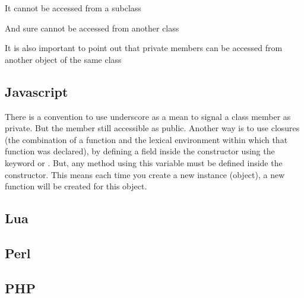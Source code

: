 \documentclass{KodeBook}
\begin{document}


It cannot be accessed from a subclass



And sure cannot be accessed from another class



It is also important to point out that private members can be accessed from another object of the same class 



\subsection{Javascript} 

There is a convention to use underscore \keyword{\_} as a mean to signal a class member as private. 
But the member still accessible as public. 
Another way is to use closures (the combination of a function and the lexical environment within which that function was declared), by defining a field inside the constructor using the keyword  or .
But, any method using this variable must be defined inside the constructor.
This means each time you create a new instance (object), a new function will be created for this object. 




\subsection{Lua}


\subsection{Perl}

%

\subsection{PHP}
\end{document}

